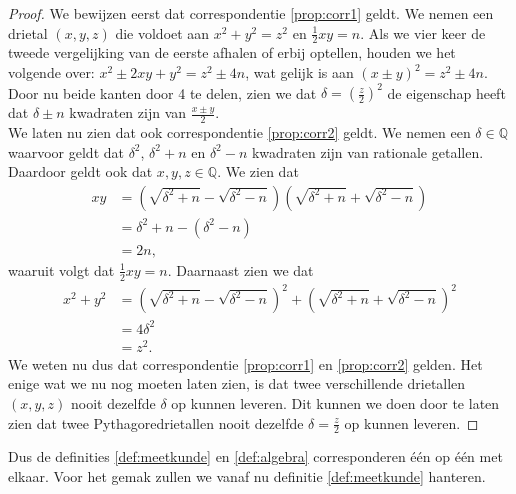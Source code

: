 \documentclass[12pt,reqno]{article}
\newcommand*{\QQ}{\ensuremath{\mathbb{Q}}}
\theoremstyle{theorem}
\theoremstyle{definition}
\begin{document}
	\begin{proof}
		We bewijzen eerst dat correspondentie \ref{prop:corr1} geldt. We nemen een drietal $(x, y, z)$ die voldoet aan $x^2 + y^2 = z^2$ en $\frac{1}{2}xy=n$. Als we vier keer de tweede vergelijking van de eerste afhalen of erbij optellen, houden we het volgende over: $x^2 \pm 2xy + y^2 = z^2 \pm 4n$, wat gelijk is aan $(x \pm y)^2 = z^2 \pm 4n$. Door nu beide kanten door 4 te delen, zien we dat $\delta = (\frac{z}{2})^2$ de eigenschap heeft dat $\delta \pm n$ kwadraten zijn van $\frac{x \pm y}{2}$. \\
		 
		We laten nu zien dat ook correspondentie \ref{prop:corr2} geldt. We nemen een $\delta\in\QQ$ waarvoor geldt dat $\delta^2$, $\delta^2+n$ en $\delta^2-n$ kwadraten zijn van rationale getallen. Daardoor geldt ook dat $x, y, z \in\QQ$. We zien dat
		\begin{align*}
			xy &= \left( \sqrt{\delta^2+n} - \sqrt{\delta^2-n} \right) \left( \sqrt{\delta^2+n} + \sqrt{\delta^2-n} \right) \\
			&= \delta^2+n - \left( \delta^2-n \right) \\
			&= 2n,
		\end{align*}
		 waaruit volgt dat $\frac{1}{2}xy = n$. Daarnaast zien we dat
		 \begin{align*}
			 x^2 + y^2 &= \left( \sqrt{\delta^2+n} - \sqrt{\delta^2-n} \right)^2 + \left( \sqrt{\delta^2+n} + \sqrt{\delta^2-n} \right)^2 \\
			 &= 4 \delta^2 \\
			 &= z^2.
		 \end{align*}
		 We weten nu dus dat correspondentie \ref{prop:corr1} en \ref{prop:corr2} gelden. Het enige wat we nu nog moeten laten zien, is dat twee verschillende drietallen $(x,y,z)$ nooit dezelfde $\delta$ op kunnen leveren. {\color{red}Dit kunnen we doen door te laten zien dat twee Pythagoredrietallen nooit dezelfde $\delta = \frac{z}{2}$ op kunnen leveren.}
		 
		 
		 
		 
		 
		 
		 
		 
		 
	\end{proof}
	Dus de definities \ref{def:meetkunde} en \ref{def:algebra} corresponderen \'e\'en op \'e\'en met elkaar. Voor het gemak zullen we vanaf nu definitie \ref{def:meetkunde} hanteren. \\
	
\end{document}
